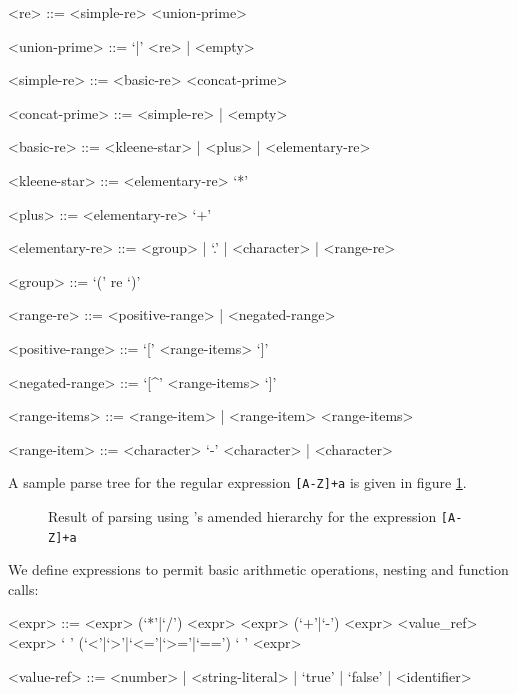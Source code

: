 \documentclass[a4paper,openany,12pt]{book}
\begin{document}
\begin{grammar}

    <re> ::= <simple-re> <union-prime>

    <union-prime> ::= `|' <re> | <empty>

    <simple-re> ::= <basic-re> <concat-prime>

    <concat-prime> ::= <simple-re> | <empty>

    <basic-re> ::= <kleene-star> | <plus> | <elementary-re>

    <kleene-star> ::= <elementary-re> `*'

    <plus> ::= <elementary-re> `+'

    <elementary-re> ::= <group> | `.' | <character> | <range-re>

    <group> ::= `(' re `)'

    <range-re> ::= <positive-range> | <negated-range>

    <positive-range> ::= `[' <range-items> `]'

    <negated-range> ::= `[^' <range-items> `]'

    <range-items> ::= <range-item> | <range-item> <range-items>

    <range-item> ::= <character> `-' <character> | <character>

\end{grammar}

A sample parse tree for the regular expression \texttt{[A-Z]+a} is given in figure \ref{fig:regex:parsetree}.

\begin{figure}
\begin{MyMdframed}
\vspace{0.5em}

\caption{\label{fig:regex:parsetree}Result of parsing using \citeauthor{cameron1999}'s amended hierarchy for the expression \texttt{[A-Z]+a}}
\vspace{0.5em}
\captionsetup{style=default}
 \begin{center}
    
  \end{center}
\end{MyMdframed}
\end{figure}

We define expressions to permit basic arithmetic operations, nesting and function calls:

\begin{grammar}
<expr> ::= <expr> (`*'|`/') <expr>
    \alt <expr> (`+'|`-') <expr>
    \alt <value_ref>
    \alt <expr> ` ' (`<'|`>'|`<='|`>='|`==') ` ' <expr>

<value-ref> ::= <number> | <string-literal> | `true' | `false' | <identifier>
\end{grammar}
\end{document}
